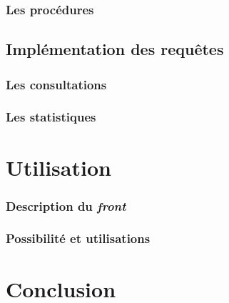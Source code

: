 \documentclass[10pt]{article}
\begin{document}
  \subsubsection{Les procédures}
  
  \subsection{Implémentation des requêtes}\label{subsec:requete}
  \subsubsection{Les consultations}
  \subsubsection{Les statistiques}
  
  \section{Utilisation}\label{sec:utili}
  \subsubsection{Description du \textit{front}}\label{subsec:desc}
  \subsubsection{Possibilité et utilisations}\label{subsec:possib}

  \section{Conclusion}\label{sec:ccl}
\end{document}
